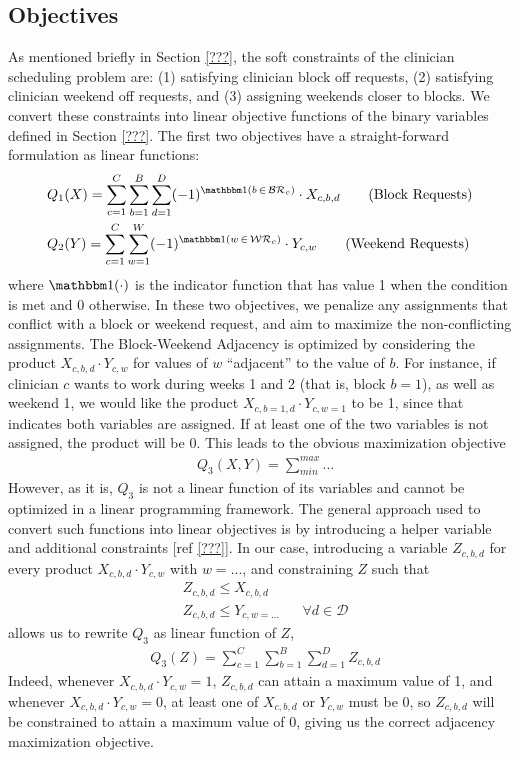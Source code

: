 \subsection{Objectives}
As mentioned briefly in Section \ref{???}, the soft constraints of the clinician scheduling problem are: (1) satisfying clinician block off requests, (2) satisfying clinician weekend off requests, and (3) assigning weekends closer to blocks. We convert these constraints into linear objective functions of the binary variables defined in Section \ref{???}. The first two objectives have a straight-forward formulation as linear functions:
\begin{align}
	&Q_1(X) = \sum_{c=1}^{C} \sum_{b=1}^{B} \sum_{d=1}^{D} (-1)^{\ind(b\,\in\,\mathcal{BR}_c)}\cdot X_{c, b, d} \tag{Block Requests} \label{eqn:obj-block-requests}\\
	&Q_2(Y) = \sum_{c=1}^{C} \sum_{w=1}^{W} (-1)^{\ind(w\,\in\,\mathcal{WR}_c)}\cdot Y_{c, w} \tag{Weekend Requests} \label{eqn:obj-weekend-requests}
\end{align}
where $\ind(\cdot)$ is the indicator function that has value 1 when the condition is met and 0 otherwise. In these two objectives, we penalize any assignments that conflict with a block or weekend request, and aim to maximize the non-conflicting assignments. The Block-Weekend Adjacency is optimized by considering the product $X_{c, b, d}\cdot Y_{c, w}$ for values of $w$ ``adjacent'' to the value of $b$. For instance, if clinician $c$ wants to work during weeks 1 and 2 (that is, block $b = 1$), as well as weekend 1, we would like the product $X_{c, b=1, d} \cdot Y_{c, w=1}$ to be 1, since that indicates both variables are assigned. If at least one of the two variables is not assigned, the product will be 0. This leads to the obvious maximization objective
\begin{align}
	&Q_3(X, Y) = \sum_{min}^{max} ... \tag{Block-Weekend Adjacency} \label{eqn:obj-block-weekend-adj}
\end{align}
However, as it is, $Q_3$ is not a linear function of its variables and cannot be optimized in a linear programming framework. The general approach used to convert such functions into linear objectives is by introducing a helper variable and additional constraints [ref \ref{???}]. In our case, introducing a variable $Z_{c, b, d}$ for every product $X_{c, b, d} \cdot Y_{c, w}$ with $w = ...$, and constraining $Z$ such that 
\begin{align}
	&Z_{c, b, d} \leq X_{c, b, d} \\
	&Z_{c, b, d} \leq Y_{c, w=...} &&\forall d\in\mathcal{D}
\end{align}
allows us to rewrite $Q_3$ as linear function of $Z$,
\begin{align}
	&Q_3(Z) = \sum_{c=1}^{C} \sum_{b=1}^{B} \sum_{d=1}^{D} Z_{c, b, d}
\end{align}
Indeed, whenever $X_{c, b, d} \cdot Y_{c, w} = 1$, $Z_{c, b, d}$ can attain a maximum value of 1, and whenever $X_{c, b, d} \cdot Y_{c, w} = 0$, at least one of $X_{c, b, d}$ or $Y_{c, w}$ must be 0, so $Z_{c, b, d}$ will be constrained to attain a maximum value of 0, giving us the correct adjacency maximization objective. \\

